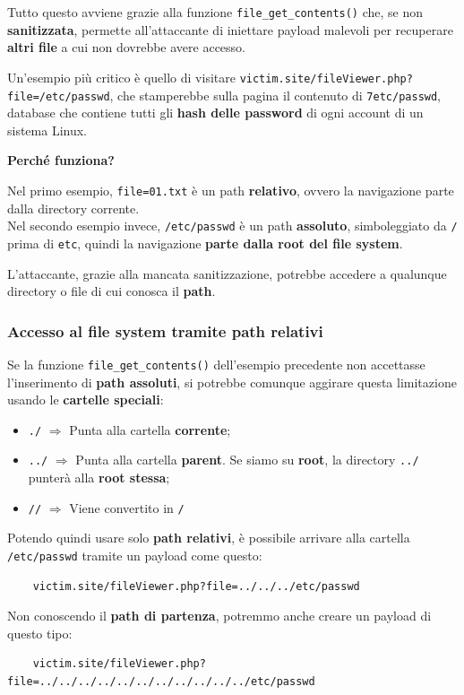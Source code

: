 \documentclass{article}
\begin{document}
Tutto questo avviene grazie alla funzione \verb|file_get_contents()| che, se non \textbf{sanitizzata}, permette all'attaccante di iniettare payload malevoli per recuperare \textbf{altri file} a cui non dovrebbe avere accesso.

Un'esempio più critico è quello di visitare \verb|victim.site/fileViewer.php?file=/etc/passwd|, che stamperebbe sulla pagina il contenuto di \verb|7etc/passwd|, database che contiene tutti gli \textbf{hash delle password} di ogni account di un sistema Linux.	

\textbf{Perché funziona?}

Nel primo esempio, \verb|file=01.txt| è un path \textbf{relativo}, ovvero la navigazione parte dalla directory corrente.\\
Nel secondo esempio invece, \verb|/etc/passwd| è un path \textbf{assoluto}, simboleggiato da \verb|/| prima di \verb|etc|, quindi la navigazione \textbf{parte dalla root del file system}.

L'attaccante, grazie alla mancata sanitizzazione, potrebbe accedere a qualunque directory o file di cui conosca il \textbf{path}.

\subsubsection{Accesso al file system tramite path relativi}
Se la funzione \verb|file_get_contents()| dell'esempio precedente non accettasse l'inserimento di \textbf{path assoluti}, si potrebbe comunque aggirare questa limitazione usando le \textbf{cartelle speciali}:
\begin{itemize}
	\item \verb|./| $\Rightarrow$ Punta alla cartella \textbf{corrente};
	
	\item \verb|../| $\Rightarrow$ Punta alla cartella \textbf{parent}. Se siamo su \textbf{root}, la directory \verb|../| punterà alla \textbf{root stessa}; 	
	
	\item \verb|//| $\Rightarrow$ Viene convertito in \verb|/|
\end{itemize}

Potendo quindi usare solo \textbf{path relativi}, è possibile arrivare alla cartella \verb|/etc/passwd| tramite un payload come questo:
\begin{verbatim}
	victim.site/fileViewer.php?file=../../../etc/passwd
\end{verbatim}
Non conoscendo il \textbf{path di partenza}, potremmo anche creare un payload di questo tipo:
\begin{verbatim}
	victim.site/fileViewer.php?file=../../../../../../../../../../../etc/passwd
\end{verbatim}
\end{document}
